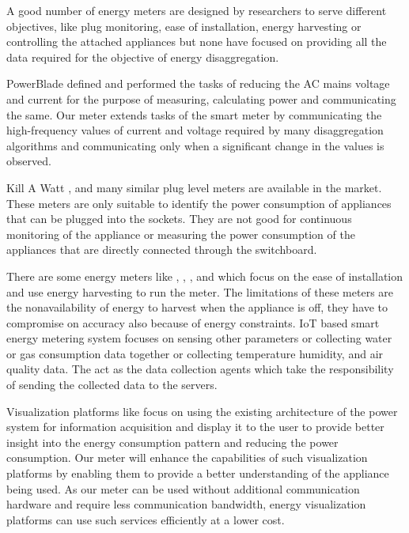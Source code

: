 A good number of energy meters are designed by researchers to serve different objectives, like plug monitoring, ease of installation, energy harvesting or controlling the attached appliances but none have focused on providing all the data required for the objective of energy disaggregation.

PowerBlade \cite{debruinPowerBladeLowProfileTruePower2015} defined and performed the tasks of reducing the AC mains voltage and current for the purpose of measuring, calculating power and communicating the same. Our meter extends tasks of the smart meter by communicating the high-frequency values of current and voltage required by many disaggregation algorithms \cite{hassanEmpiricalInvestigationVI2014} \cite{guptaElectriSenseSinglepointSensing2010} \cite{gulatiDepthStudyUsing2014} \cite{BOLT} and communicating only when a significant change in the values is observed.

Kill A Watt \cite{KillWattMeter}, and many similar plug level meters are available in the market. These meters are only suitable to identify the power consumption of appliances that can be plugged into the sockets. They are not good for continuous monitoring of the appliance or measuring the power consumption of the appliances that are directly connected through the switchboard.

There are some energy meters like \cite{mogheDesignLowCost2010}, \cite{caiSelfpoweredSmartMeter2012}, \cite{debruinMonjoloEnergyharvestingEnergy2013}, and \cite{villaniContactlessThreephaseAutonomous2016} which focus on the ease of installation and use energy harvesting to run the meter. The limitations of these meters are the nonavailability of energy to harvest when the appliance is off, they have to compromise on accuracy also because of energy constraints. IoT based smart energy metering system \cite{al-aliIoTBasedSmartUtility2018} \cite{yaghmaeeDesignImplementationInternet2018} focuses on sensing other parameters or collecting water or gas consumption data together or collecting temperature humidity, and air quality data. The act as the data collection agents which take the responsibility of sending the collected data to the servers.

Visualization platforms like \cite{luDesignImplementationPower2016} focus on using the existing architecture of the power system for information acquisition and display it to the user to provide better insight into the energy consumption pattern and reducing the power consumption. Our meter will enhance the capabilities of such visualization platforms by enabling them to provide a better understanding of the appliance being used. As our meter can be used without additional communication hardware and require less communication bandwidth, energy visualization platforms can use such services efficiently at a lower cost.

